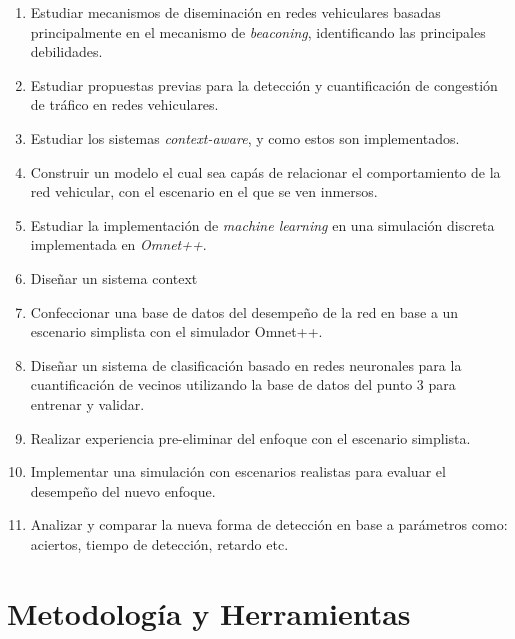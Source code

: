 \begin{enumerate}
	\item Estudiar mecanismos de diseminación en redes vehiculares basadas principalmente en el mecanismo de \textit{beaconing}, identificando las principales debilidades.
    \item Estudiar propuestas previas para la detección y cuantificación de congestión de tráfico en redes vehiculares.
    \item Estudiar los sistemas \textit{context-aware}, y como estos son implementados.
    \item Construir un modelo el cual sea capás de relacionar el comportamiento de la red vehicular, con el escenario en el que se ven inmersos. 
    \item Estudiar la implementación de \textit{machine learning} en una simulación discreta implementada en \textit{Omnet++}.
    
    \item Diseñar un sistema context 
    
    
    \item Confeccionar una base de datos del desempeño de la red en base a un escenario simplista con el simulador Omnet++.
    \item Diseñar un sistema de clasificación basado en redes neuronales para la cuantificación de vecinos utilizando la base de datos del punto 3 para entrenar y validar.
    \item Realizar experiencia pre-eliminar del enfoque con el escenario simplista.
    \item Implementar una simulación con escenarios realistas para evaluar el desempeño del nuevo enfoque.
    \item Analizar y comparar la nueva forma de detección en base a parámetros como: aciertos, tiempo de detección, retardo etc.
\end{enumerate}


\section{Metodología y Herramientas}
